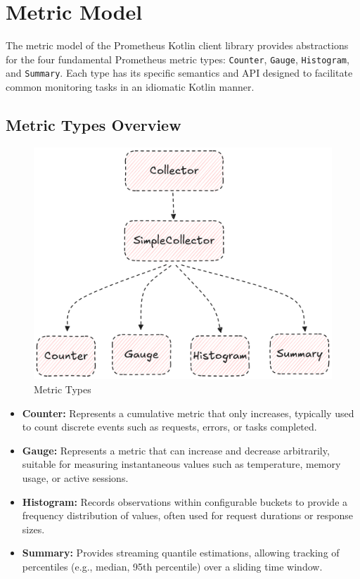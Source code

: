 \section{Metric Model}\label{sec:metric-model}

The metric model of the Prometheus Kotlin client library provides abstractions for the four fundamental Prometheus metric types: \texttt{Counter}, \texttt{Gauge}, \texttt{Histogram}, and \texttt{Summary}. Each type has its specific semantics and API designed to facilitate common monitoring tasks in an idiomatic Kotlin manner.

\subsection{Metric Types Overview}\label{subsec:metric-types-overview}

\begin{figure}[h]
    \centering
    \includegraphics[width=\linewidth, keepaspectratio]{./figures/metric_types}
    \caption{Metric Types}
\end{figure}

\begin{itemize}
    \item \textbf{Counter:} Represents a cumulative metric that only increases, typically used to count discrete events such as requests, errors, or tasks completed.

    \item \textbf{Gauge:} Represents a metric that can increase and decrease arbitrarily, suitable for measuring instantaneous values such as temperature, memory usage, or active sessions.

    \item \textbf{Histogram:} Records observations within configurable buckets to provide a frequency distribution of values, often used for request durations or response sizes.

    \item \textbf{Summary:} Provides streaming quantile estimations, allowing tracking of percentiles (e.g., median, 95th percentile) over a sliding time window.
\end{itemize}

